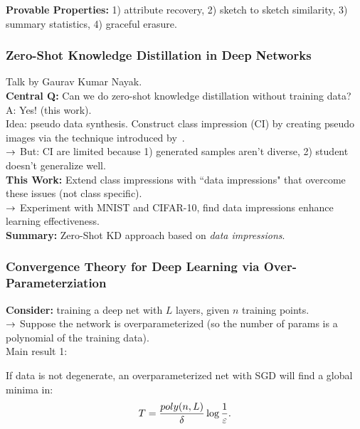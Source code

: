 {\bf Provable Properties:} 1) attribute recovery, 2) sketch to sketch similarity, 3) summary statistics, 4) graceful erasure.


\spacerule

\subsubsection{Zero-Shot Knowledge Distillation in Deep Networks~\cite{nayak2019zero}}

Talk by Gaurav Kumar Nayak. \\

{\bf Central Q:} Can we do zero-shot knowledge distillation without training data? \\

A: Yes! (this work). \\

Idea: pseudo data synthesis. Construct class impression (CI) by creating pseudo images via the technique introduced by~\citet{reddy2018ask}. \\

$\rightarrow$ But: CI are limited because 1) generated samples aren't diverse, 2) student doesn't generalize well. \\

{\bf This Work:} Extend class impressions with ``data impressions" that overcome these issues (not class specific). \\

$\rightarrow$ Experiment with MNIST and CIFAR-10, find data impressions enhance learning effectiveness. \\

{\bf Summary:} Zero-Shot KD approach based on {\it data impressions}.

\spacerule

\subsubsection{Convergence Theory for Deep Learning via Over-Parameterziation~\cite{allen2018convergence}}

{\bf Consider:} training a deep net with $L$ layers, given $n$ training points. \\

$\rightarrow$ Suppose the network is overparameterized (so the number of params is a polynomial of the training data). \\

Main result 1:
\begin{theorem}
If data is not degenerate, an overparameterized net with SGD will find a global minima in:
\[
T = \frac{poly(n, L)}{\delta} \log \frac{1}{\varepsilon}.
\]
\end{theorem}

